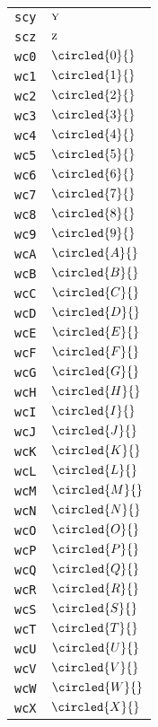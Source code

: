 \begin{longtable}{ll}
\texttt{scy}&${}{\textsc{y}}{}$\\
\texttt{scz}&${}{\textsc{z}}{}$\\
\texttt{wc0}&${}\circled{0}{}$\\
\texttt{wc1}&${}\circled{1}{}$\\
\texttt{wc2}&${}\circled{2}{}$\\
\texttt{wc3}&${}\circled{3}{}$\\
\texttt{wc4}&${}\circled{4}{}$\\
\texttt{wc5}&${}\circled{5}{}$\\
\texttt{wc6}&${}\circled{6}{}$\\
\texttt{wc7}&${}\circled{7}{}$\\
\texttt{wc8}&${}\circled{8}{}$\\
\texttt{wc9}&${}\circled{9}{}$\\
\texttt{wcA}&${}\circled{A}{}$\\
\texttt{wcB}&${}\circled{B}{}$\\
\texttt{wcC}&${}\circled{C}{}$\\
\texttt{wcD}&${}\circled{D}{}$\\
\texttt{wcE}&${}\circled{E}{}$\\
\texttt{wcF}&${}\circled{F}{}$\\
\texttt{wcG}&${}\circled{G}{}$\\
\texttt{wcH}&${}\circled{H}{}$\\
\texttt{wcI}&${}\circled{I}{}$\\
\texttt{wcJ}&${}\circled{J}{}$\\
\texttt{wcK}&${}\circled{K}{}$\\
\texttt{wcL}&${}\circled{L}{}$\\
\texttt{wcM}&${}\circled{M}{}$\\
\texttt{wcN}&${}\circled{N}{}$\\
\texttt{wcO}&${}\circled{O}{}$\\
\texttt{wcP}&${}\circled{P}{}$\\
\texttt{wcQ}&${}\circled{Q}{}$\\
\texttt{wcR}&${}\circled{R}{}$\\
\texttt{wcS}&${}\circled{S}{}$\\
\texttt{wcT}&${}\circled{T}{}$\\
\texttt{wcU}&${}\circled{U}{}$\\
\texttt{wcV}&${}\circled{V}{}$\\
\texttt{wcW}&${}\circled{W}{}$\\
\texttt{wcX}&${}\circled{X}{}$\\

\end{longtable}
